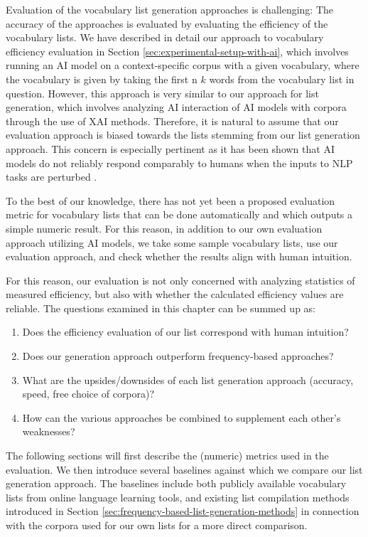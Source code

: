 Evaluation of the vocabulary list generation approaches is challenging:
The accuracy of the approaches is evaluated by evaluating the efficiency of the vocabulary lists.
We have described in detail our approach to vocabulary efficiency evaluation in Section \ref{sec:experimental-setup-with-ai}, which involves running an AI model on a context-specific corpus with a given vocabulary, where the vocabulary is given by taking the first n $k$ words from the vocabulary list in question.
However, this approach is very similar to our approach for list generation, which involves analyzing AI interaction of AI models with corpora through the use of XAI methods.
Therefore, it is natural to assume that our evaluation approach is biased towards the lists stemming from our list generation approach.
This concern is especially pertinent as it has been shown that AI models do not reliably respond comparably to humans when the inputs to NLP tasks are perturbed \cite{tjuatjaLLMsExhibitHumanlike2024}.

To the best of our knowledge, there has not yet been a proposed evaluation metric for vocabulary lists that can be done automatically and which outputs a simple numeric result.
For this reason, in addition to our own evaluation approach utilizing AI models, we take some sample vocabulary lists, use our evaluation approach, and check whether the results align with human intuition.

For this reason, our evaluation is not only concerned with analyzing statistics of measured efficiency, but also with whether the calculated efficiency values are reliable.
The questions examined in this chapter can be summed up as:
\begin{enumerate}
	\item Does the efficiency evaluation of our list correspond with human intuition?
	\item Does our generation approach outperform frequency-based approaches?
	\item What are the upsides/downsides of each list generation approach (accuracy, speed, free choice of corpora)?
	\item How can the various approaches be combined to supplement each other's weaknesses?
\end{enumerate}

The following sections will first describe the (numeric) metrics used in the evaluation.
We then introduce several baselines against which we compare our list generation approach.
The baselines include both publicly available vocabulary lists from online language learning tools, and existing list compilation methods introduced in Section \ref{sec:frequency-based-list-generation-methods} in connection with the corpora used for our own lists for a more direct comparison.

